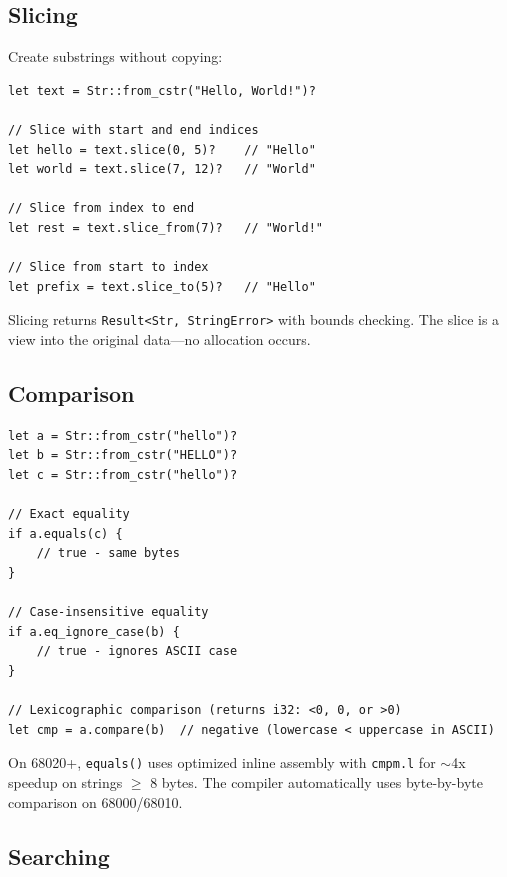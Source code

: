 \subsection{Slicing}

Create substrings without copying:

\begin{lstlisting}
let text = Str::from_cstr("Hello, World!")?

// Slice with start and end indices
let hello = text.slice(0, 5)?    // "Hello"
let world = text.slice(7, 12)?   // "World"

// Slice from index to end
let rest = text.slice_from(7)?   // "World!"

// Slice from start to index
let prefix = text.slice_to(5)?   // "Hello"
\end{lstlisting}

\begin{notebox}
Slicing returns \texttt{Result<Str, StringError>} with bounds checking. The slice is a view into the original data---no allocation occurs.
\end{notebox}

\subsection{Comparison}

\begin{lstlisting}
let a = Str::from_cstr("hello")?
let b = Str::from_cstr("HELLO")?
let c = Str::from_cstr("hello")?

// Exact equality
if a.equals(c) {
    // true - same bytes
}

// Case-insensitive equality
if a.eq_ignore_case(b) {
    // true - ignores ASCII case
}

// Lexicographic comparison (returns i32: <0, 0, or >0)
let cmp = a.compare(b)  // negative (lowercase < uppercase in ASCII)
\end{lstlisting}

\begin{comingfromc}
On 68020+, \texttt{equals()} uses optimized inline assembly with \texttt{cmpm.l} for $\sim$4x speedup on strings $\geq$ 8 bytes. The compiler automatically uses byte-by-byte comparison on 68000/68010.
\end{comingfromc}

\subsection{Searching}

